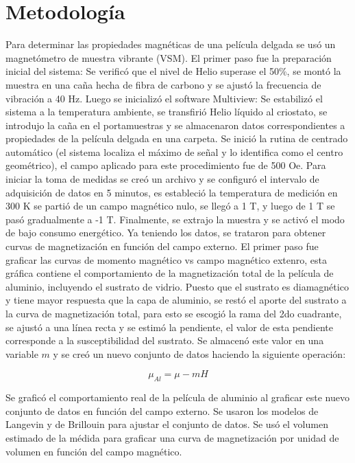 \documentclass[14pt,a4paper,twocolumn]{article}
\begin{document}
\section{Metodología}

Para determinar las propiedades magnéticas de una película delgada se usó un magnetómetro de muestra vibrante (VSM). El primer paso fue la preparación inicial del sistema: Se verificó que el nivel de Helio superase el 50\%, se montó la muestra en una caña hecha de fibra de carbono y se ajustó la frecuencia de vibración a 40 Hz. Luego se inicializó el software Multiview: Se estabilizó el sistema a la temperatura ambiente, se transfirió Helio líquido al criostato, se introdujo la caña en el portamuestras y se almacenaron datos correspondientes a propiedades de la película delgada en una carpeta. Se inició la rutina de centrado automático (el sistema localiza el máximo de señal y lo identifica como el centro geométrico), el campo aplicado para este procedimiento fue de 500 Oe. Para iniciar la toma de medidas se creó un archivo y se configuró el intervalo de adquisición de datos en 5 minutos, es estableció la temperatura de medición en 300 K se partió de un campo magnético nulo, se llegó a 1 T, y luego de 1 T se pasó gradualmente a -1 T. Finalmente, se extrajo la muestra y se activó el modo de bajo consumo energético. Ya teniendo los datos, se trataron para obtener curvas de magnetización en función del campo externo. El primer paso fue graficar las curvas de momento magnético vs campo magnético extenro, esta gráfica contiene el comportamiento de la magnetización total de la película de aluminio, incluyendo el sustrato de vidrio. Puesto que el sustrato es diamagnético y tiene mayor respuesta que la capa de aluminio, se restó el aporte del sustrato a la curva de magnetización total, para esto se escogió la rama del 2do cuadrante, se ajustó a una línea recta y se estimó la pendiente, el valor de esta pendiente corresponde a la susceptibilidad del sustrato. Se almacenó este valor en una variable $m$ y se creó un nuevo conjunto de datos haciendo la siguiente operación:

\begin{equation}
\mu_{Al} = \mu-mH    
\end{equation}

Se graficó el comportamiento real de la película de aluminio al graficar este nuevo conjunto de datos en función del campo externo. Se usaron los modelos de Langevin y de Brillouin para ajustar el conjunto de datos. Se usó el volumen estimado de la médida para graficar una curva de magnetización por unidad de volumen en función del campo magnético.
\end{document}
